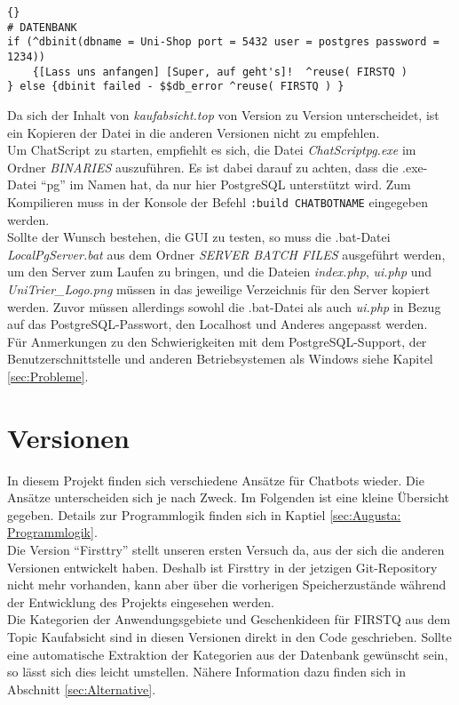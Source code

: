 \begin{lstlisting}{}
# DATENBANK
if (^dbinit(dbname = Uni-Shop port = 5432 user = postgres password = 1234))
	{[Lass uns anfangen] [Super, auf geht's]!  ^reuse( FIRSTQ )
} else {dbinit failed - $$db_error ^reuse( FIRSTQ ) }
\end{lstlisting}

Da sich der Inhalt von \textit{kaufabsicht.top} von Version zu Version unterscheidet, ist ein Kopieren der Datei in die anderen Versionen nicht zu empfehlen.\\
Um ChatScript zu starten, empfiehlt es sich, die Datei \textit{ChatScriptpg.exe} im Ordner \textit{BINARIES} auszuführen. Es ist dabei darauf zu achten, dass die .exe-Datei "`pg"' im Namen hat,  da nur hier PostgreSQL unterstützt wird. Zum Kompilieren muss in der Konsole der Befehl \lstinline|:build CHATBOTNAME| eingegeben werden.\\
Sollte der Wunsch bestehen, die GUI zu testen, so muss die .bat-Datei \textit{LocalPgServer.bat} aus dem Ordner \textit{SERVER BATCH FILES} ausgeführt werden, um den Server zum Laufen zu bringen, und die Dateien \textit{index.php}, \textit{ui.php} und \textit{UniTrier\_Logo.png} müssen in das jeweilige Verzeichnis für den Server kopiert werden. Zuvor müssen allerdings sowohl die .bat-Datei als auch \textit{ui.php} in Bezug auf das PostgreSQL-Passwort, den Localhost und Anderes angepasst werden.\\
Für Anmerkungen zu den Schwierigkeiten mit dem PostgreSQL-Support, der Benutzerschnittstelle und anderen Betriebsystemen als Windows siehe Kapitel \ref{sec:Probleme}.\\


\section{Versionen}
\label{sec:Versionen}

In diesem Projekt finden sich verschiedene Ansätze für Chatbots wieder. Die Ansätze unterscheiden sich je nach Zweck. Im Folgenden ist eine kleine Übersicht gegeben. Details zur Programmlogik finden sich in Kaptiel \ref{sec:Augusta: Programmlogik}.\\
Die Version "`Firsttry"' stellt unseren ersten Versuch da, aus der sich die anderen Versionen entwickelt haben. Deshalb ist Firsttry in der jetzigen Git-Repository nicht mehr vorhanden, kann aber über die vorherigen Speicherzustände während der Entwicklung des Projekts eingesehen werden.\\
Die Kategorien der Anwendungsgebiete und Geschenkideen für FIRSTQ aus dem Topic Kaufabsicht sind in diesen Versionen direkt in den Code geschrieben. Sollte eine automatische Extraktion der Kategorien aus der Datenbank gewünscht sein, so lässt sich dies leicht umstellen. Nähere Information dazu finden sich in Abschnitt \ref{sec:Alternative}.\\



